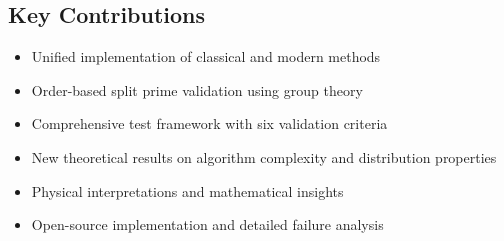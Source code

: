 \documentclass[12pt]{article}
\begin{document}
\subsection{Key Contributions}

\begin{itemize}
\item Unified implementation of classical and modern methods
\item Order-based split prime validation using group theory
\item Comprehensive test framework with six validation criteria
\item New theoretical results on algorithm complexity and distribution properties
\item Physical interpretations and mathematical insights
\item Open-source implementation and detailed failure analysis
\end{itemize}
\end{document}
